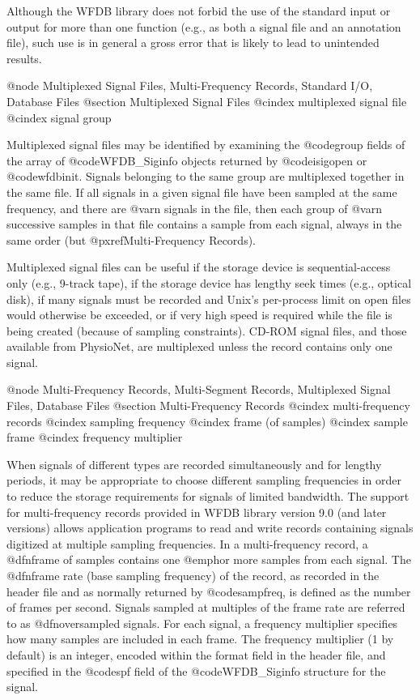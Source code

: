 {{{{{{{{{{Although the WFDB library does not forbid the use of the standard
input or output for more than one function (e.g., as both a signal file
and an annotation file), such use is in general a gross error that is
likely to lead to unintended results.

@node     Multiplexed Signal Files, Multi-Frequency Records, Standard I/O, Database Files
@section Multiplexed Signal Files
@cindex multiplexed signal file
@cindex signal group

Multiplexed signal files may be identified by examining the @code{group}
fields of the array of @code{WFDB_Siginfo} objects returned by
@code{isigopen} or @code{wfdbinit}.  Signals belonging to the same group
are multiplexed together in the same file.  If all signals in a given signal
file have been sampled at the same frequency, and there are @var{n} signals
in the file, then each group of @var{n} successive samples in that file
contains a sample from each signal, always in the same order
(but @pxref{Multi-Frequency Records}).

Multiplexed signal files can be useful if the storage device is
sequential-access only (e.g., 9-track tape), if the storage device has lengthy
seek times (e.g., optical disk), if many signals must be recorded and Unix's
per-process limit on open files would otherwise be exceeded, or if very high
speed is required while the file is being created (because of sampling
constraints).  CD-ROM signal files, and those available from PhysioNet, are
multiplexed unless the record contains only one signal.

@node     Multi-Frequency Records, Multi-Segment Records, Multiplexed Signal Files, Database Files
@section Multi-Frequency Records
@cindex multi-frequency records
@cindex sampling frequency
@cindex frame (of samples)
@cindex sample frame
@cindex frequency multiplier

When signals of different types are recorded simultaneously and for
lengthy periods, it may be appropriate to choose different sampling
frequencies in order to reduce the storage requirements for signals of
limited bandwidth.  The support for multi-frequency records provided in
WFDB library version 9.0 (and later versions) allows application programs
to read and write records containing signals digitized at multiple
sampling frequencies.  In a multi-frequency record, a @dfn{frame} of
samples contains one @emph{or more} samples from each signal.  The
@dfn{frame rate} (base sampling frequency) of the record, as recorded in the
header file and as normally returned by @code{sampfreq}, is defined as
the number of frames per second.  Signals sampled at multiples of the
frame rate are referred to as @dfn{oversampled signals}.  For each signal, a
frequency multiplier specifies how many samples are included in each
frame.  The frequency multiplier (1 by default) is an integer, encoded
within the format field in the header file, and specified in the
@code{spf} field of the @code{WFDB_Siginfo} structure for the signal.

}}}}}}}}}}
